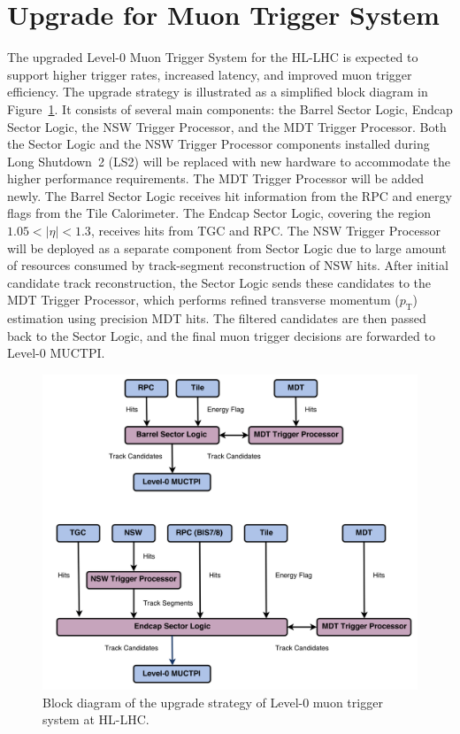 \section{Upgrade for Muon Trigger System} \label{sec:MuonTriggerUpgrade}
The upgraded Level-0 Muon Trigger System for the HL-LHC is expected to support higher trigger rates, increased latency, and improved muon trigger efficiency. The upgrade strategy is illustrated as a simplified block diagram in Figure~\ref{fig:muon_trigger_upgrade}. It consists of several main components: the Barrel Sector Logic, Endcap Sector Logic, the NSW Trigger Processor, and the MDT Trigger Processor. Both the Sector Logic and the NSW Trigger Processor components installed during Long Shutdown~2 (LS2) will be replaced with new hardware to accommodate the higher performance requirements. The MDT Trigger Processor will be added newly. The Barrel Sector Logic receives hit information from the RPC and energy flags from the Tile Calorimeter. The Endcap Sector Logic, covering the region $1.05 < |\eta| < 1.3$, receives hits from TGC and RPC. The NSW Trigger Processor will be deployed as a separate component from Sector Logic due to large amount of resources consumed by track-segment reconstruction of NSW hits. After initial candidate track reconstruction, the Sector Logic sends these candidates to the MDT Trigger Processor, which performs refined transverse momentum ($p_\mathrm{T}$) estimation using precision MDT hits. The filtered candidates are then passed back to the Sector Logic, and the final muon trigger decisions are forwarded to Level-0 MUCTPI.

\begin{figure}[htbp]
  \centering
  \includegraphics[width=1.0\textwidth]{figs/chapter2/muon_trigger_upgrade.png}
  \caption{Block diagram of the upgrade strategy of Level-0 muon trigger system at HL-LHC.}
  \label{fig:muon_trigger_upgrade}
\end{figure}
